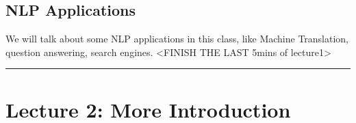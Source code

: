 \documentclass[11pt]{article}
\begin{document}
\subsection*{NLP Applications}
We will talk about some NLP applications in this class, like Machine Translation, question answering, search engines.  <FINISH THE LAST 5mins of lecture1>

\vspace{0.5em}
\noindent\rule{\textwidth}{5pt}
\vspace{0.5em}

\newpage

\section*{Lecture 2: More Introduction}
\end{document}
